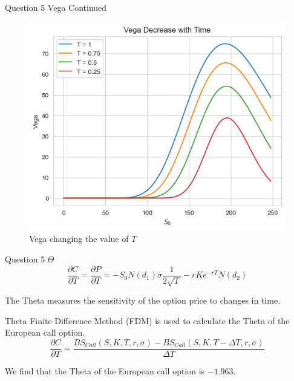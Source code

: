 \documentclass[compress,12pt]{beamer}
\begin{document}
\begin{frame}{Question 5 Vega Continued}
      \begin{figure}
            \centering
            \includegraphics[scale=0.6]{./imgs/vega.png}
            \caption{Vega changing the value of $T$}
      \end{figure}

\end{frame}


\begin{frame}{Question 5 $\Theta$}
      \begin{equation*}
            \frac{\partial {C}}{\partial T} =\frac{\partial {P}}{\partial T}=-S_0N(d_1)\sigma\frac{1}{2\sqrt{T}} - rKe^{-rT}N(d_2)
      \end{equation*}

      The Theta measures the sensitivity of the option price to changes in time.

      Theta Finite Difference Method (FDM) is used to calculate the Theta of the European call option.
      \tiny{
            \begin{equation*}
                  \frac{\partial C}{\partial T} = \frac{BS_{Call}(S, K, T,r,\sigma) - BS_{Call}(S , K, T-\Delta T,r,\sigma)}{\Delta T}
            \end{equation*}
      }
      \normalsize
      \begin{tcolorbox}
            We find that the Theta of the European call option is $\boxed{-1.963}$.
      \end{tcolorbox}

\end{frame}
\end{document}
